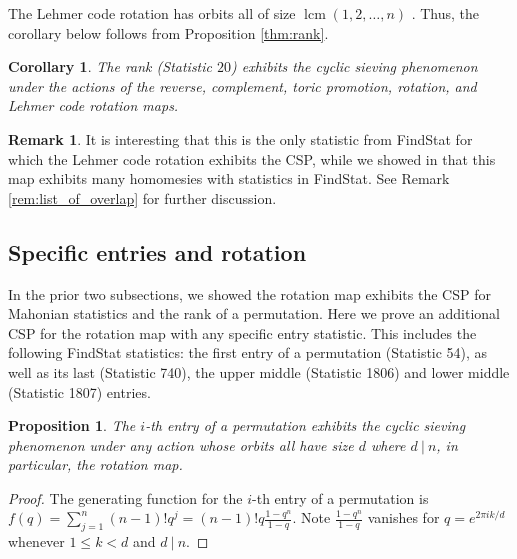 \documentclass{amsart}
\newtheorem{cor}[thm]{Corollary}
\newtheorem{prop}[thm]{Proposition}
\theoremstyle{definition}
\newtheorem{remark}[thm]{Remark}
\DeclareMathOperator{\lcm}{lcm}
\begin{document}
The Lehmer code rotation has orbits all of size $\lcm(1,2,\ldots,n)$ \cite[Theorem 4.8]{ELMSW22}. Thus, the corollary below follows from Proposition \ref{thm:rank}.
 
\begin{cor}\label{rank_cor}
The rank (Statistic $20$)  exhibits the cyclic sieving phenomenon under the actions of the reverse, complement, toric promotion, rotation, and Lehmer code rotation maps.
\end{cor}

\begin{remark}
  It is interesting that this is the only statistic from FindStat for which the Lehmer code rotation exhibits the CSP, while we showed in \cite{ELMSW22} that this map exhibits many homomesies with statistics in FindStat.
  See Remark \ref{rem:list_of_overlap} for further discussion.
\end{remark}


\subsection{Specific entries and rotation}
In the prior two subsections, we showed the rotation map exhibits the CSP for Mahonian statistics and the rank of a permutation. Here we prove an additional CSP for the rotation map with any specific entry statistic. This includes the following FindStat statistics:
the first entry of a permutation (Statistic 54), as well as its last (Statistic 740), the upper middle (Statistic 1806) and lower middle (Statistic 1807) entries.%

\begin{prop}\label{prop:ith_entry}
  The $i$-th entry of a permutation exhibits the cyclic sieving phenomenon under any action whose orbits all have size $d$ where $d \ | \ n$, in particular, the rotation map. 
\end{prop}

\begin{proof}
  The generating function for the $i$-th entry of a permutation is $f(q) = \displaystyle\sum_{j = 1}^n (n-1)! q^j=(n-1)!q\frac{1-q^n}{1-q}$. Note $\frac{1-q^n}{1-q}$ vanishes for $q=e^{2\pi i k/d}$ whenever $1\leq k < d$ and $d \ | \ n$.
%
\end{proof}
\end{document}
